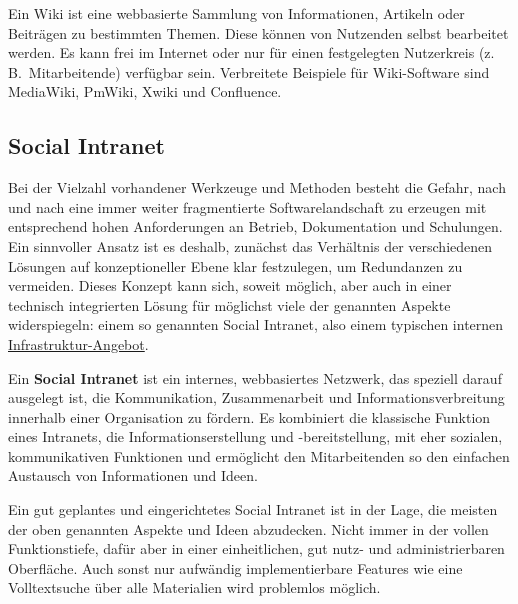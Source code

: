 \documentclass[
  11pt,
  letterpaper,
  DIV=11,
  twoside]{scrreprt}
\begin{document}
Ein Wiki ist eine webbasierte Sammlung von Informationen, Artikeln oder
Beiträgen zu bestimmten Themen. Diese können von Nutzenden selbst
bearbeitet werden. Es kann frei im Internet oder nur für einen
festgelegten Nutzerkreis (z.\,B.~Mitarbeitende) verfügbar sein.
Verbreitete Beispiele für Wiki-Software sind MediaWiki, PmWiki, Xwiki
und Confluence.

\subsection{Social Intranet}\label{social-intranet-1}

Bei der Vielzahl vorhandener Werkzeuge und Methoden besteht die Gefahr,
nach und nach eine immer weiter fragmentierte Softwarelandschaft zu
erzeugen mit entsprechend hohen Anforderungen an Betrieb, Dokumentation
und Schulungen. Ein sinnvoller Ansatz ist es deshalb, zunächst das
Verhältnis der verschiedenen Lösungen auf konzeptioneller Ebene klar
festzulegen, um Redundanzen zu vermeiden. Dieses Konzept kann sich,
soweit möglich, aber auch in einer technisch integrierten Lösung für
möglichst viele der genannten Aspekte widerspiegeln: einem so genannten
Social Intranet, also einem typischen internen
\hyperref[social-intranet]{Infrastruktur-Angebot}.

\begin{tcolorbox}[enhanced jigsaw, leftrule=.75mm, toprule=.15mm, left=2mm, opacityback=0, arc=.35mm, colback=white, breakable, colframe=quarto-callout-tip-color-frame, rightrule=.15mm, bottomrule=.15mm]
\begin{minipage}[t]{5.5mm}
\textcolor{quarto-callout-tip-color}{\faLightbulb}
\end{minipage}%
\begin{minipage}[t]{\textwidth - 5.5mm}

Ein \textbf{Social Intranet} ist ein internes, webbasiertes Netzwerk,
das speziell darauf ausgelegt ist, die Kommunikation, Zusammenarbeit und
Informationsverbreitung innerhalb einer Organisation zu fördern. Es
kombiniert die klassische Funktion eines Intranets, die
Informationserstellung und -bereitstellung, mit eher sozialen,
kommunikativen Funktionen und ermöglicht den Mitarbeitenden so den
einfachen Austausch von Informationen und Ideen.

\end{minipage}%
\end{tcolorbox}

Ein gut geplantes und eingerichtetes Social Intranet ist in der Lage,
die meisten der oben genannten Aspekte und Ideen abzudecken. Nicht immer
in der vollen Funktionstiefe, dafür aber in einer einheitlichen, gut
nutz- und administrierbaren Oberfläche. Auch sonst nur aufwändig
implementierbare Features wie eine Volltextsuche über alle Materialien
wird problemlos möglich.
\end{document}
